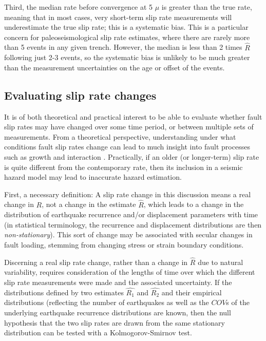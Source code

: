 \documentclass[se, manuscript]{copernicus}
\begin{document}
Third, the median rate before convergence at 5 \(\mu\) is greater than
the true rate, meaning that in most cases, very short-term slip rate
measurements will underestimate the true slip rate; this is a systematic
bias. This is a particular concern for paleoseismological slip rate
estimates, where there are rarely more than 5 events in any given
trench. However, the median is less than 2 times \(\hat{R}\) following
just 2-3 events, so the systematic bias is unlikely to be much greater
than the measurement uncertainties on the age or offset of the events.

\subsection{Evaluating slip rate
changes}\label{evaluating-slip-rate-changes}

It is of both theoretical and practical interest to be able to evaluate
whether fault slip rates may have changed over some time period, or
between multiple sets of measurements. From a theoretical perspective,
understanding under what conditions fault slip rates change can lead to
much insight into fault processes such as growth
\citep[e.g.]{roberts_fault_2002} and interaction
\citep[e.g.]{wallace_grouping_1987,dolan_long-range_2007}. Practically,
if an older (or longer-term) slip rate is quite different from the
contemporary rate, then its inclusion in a seismic hazard model may lead
to inaccurate hazard estimation.

First, a necessary definition: A slip rate change in this discussion
means a real change in \(R\), not a change in the estimate \(\hat{R}\),
which leads to a change in the distribution of earthquake recurrence
and/or displacement parameters with time (in statistical terminology,
the recurrence and displacement distributions are then
\emph{non-stationary}). This sort of change may be associated with
secular changes in fault loading, stemming from changing stress or
strain boundary conditions.

Discerning a real slip rate change, rather than a change in \(\hat{R}\)
due to natural variability, requires consideration of the lengths of
time over which the different slip rate measurements were made and the
associated uncertainty. If the distributions defined by two estimates
\(\hat{R_1}\) and \(\hat{R_2}\) and their empirical distributions
(reflecting the number of earthquakes as well as the \(COV\)s of the
underlying earthquake recurrence distributions are known, then the null
hypothesis that the two slip rates are drawn from the same stationary
distribution can be tested with a Kolmogorov-Smirnov test.
\end{document}
